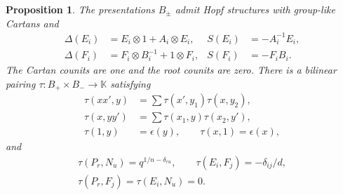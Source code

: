 \documentclass[11pt]{article}
\newtheorem{proposition}[theorem]{Proposition}
\theoremstyle{definition}
\theoremstyle{remark}
\newcommand{\kk}{\mathbb{K}}
\begin{document}
\begin{proposition}\label{prop:pairing}
The presentations $B_\pm$ admit Hopf structures with group-like Cartans and
\begin{equation}\label{eq:hopf}
 \begin{aligned}
 \Delta(E_i)&=E_i\otimes1+A_i\otimes E_i,&S(E_i)&=-A_i^{-1}E_i,\\
 \Delta(F_i)&=F_i\otimes B_i^{-1}+1\otimes F_i,&S(F_i)&=-F_iB_i.
 \end{aligned}
\end{equation}
The Cartan counits are one and the root counits are zero. There is a bilinear pairing $\tau:B_+\times B_-\to\kk$ satisfying
\begin{equation}\label{eq:skew}
 \begin{aligned}
 \tau(xx',y)&=\sum\tau(x',y_1)\tau(x,y_2),\\
 \tau(x,yy')&=\sum\tau(x_1,y)\tau(x_2,y'),\\
 \tau(1,y)&=\epsilon(y),\qquad \tau(x,1)=\epsilon(x),
 \end{aligned}
\end{equation}
and
\begin{equation}\label{eq:table}
 \begin{gathered}
 \tau(P_r,N_u)=q^{1/n-\delta_{ru}},\qquad
 \tau(E_i,F_j)=-\delta_{ij}/d,\\
 \tau(P_r,F_j)=\tau(E_i,N_u)=0.
 \end{gathered}
\end{equation}
\end{proposition}
\end{document}
